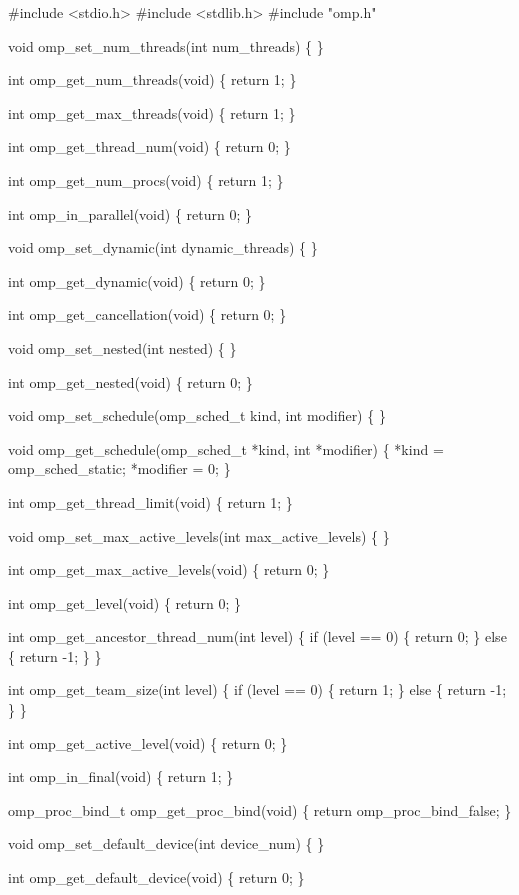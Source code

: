 {\small \begin{codepar}
\#include <stdio.h>
\#include <stdlib.h>
\#include "omp.h"

void omp\_set\_num\_threads(int num\_threads)
\{
\}

int omp\_get\_num\_threads(void)
\{
    return 1;
\}

int omp\_get\_max\_threads(void)
\{
    return 1;
\}

int omp\_get\_thread\_num(void)
\{
    return 0;
\}

int omp\_get\_num\_procs(void)
\{
    return 1;
\}

int omp\_in\_parallel(void)
\{
    return 0;
\}

void omp\_set\_dynamic(int dynamic\_threads)
\{
\}

int omp\_get\_dynamic(void)
\{
    return 0;
\}

int omp\_get\_cancellation(void)
\{
    return 0;
\}

void omp\_set\_nested(int nested)
\{
\}

int omp\_get\_nested(void)
\{
    return 0;
\}

void omp\_set\_schedule(omp\_sched\_t kind, int modifier)
\{
\}

void omp\_get\_schedule(omp\_sched\_t *kind, int *modifier)
\{
    *kind = omp\_sched\_static;
    *modifier = 0;
\}

int omp\_get\_thread\_limit(void)
\{
    return 1;
\}

void omp\_set\_max\_active\_levels(int max\_active\_levels)
\{
\}

int omp\_get\_max\_active\_levels(void)
\{
    return 0;
\}

int omp\_get\_level(void)
\{
    return 0;
\}

int omp\_get\_ancestor\_thread\_num(int level)
\{
    if (level == 0)
    \{
        return 0;
    \}
    else
    \{
        return -1;
    \}
\}

int omp\_get\_team\_size(int level)
\{
    if (level == 0)
    \{
        return 1;
    \}
    else
    \{
        return -1;
    \}
\}

int omp\_get\_active\_level(void)
\{
    return 0;
\}

int omp\_in\_final(void)
\{
    return 1;
\}

omp\_proc\_bind\_t omp\_get\_proc\_bind(void) 
\{
    return omp\_proc\_bind\_false;
\}

void omp\_set\_default\_device(int device\_num)
\{
\}

int omp\_get\_default\_device(void)
\{
    return 0;
\}


\end{codepar}}
